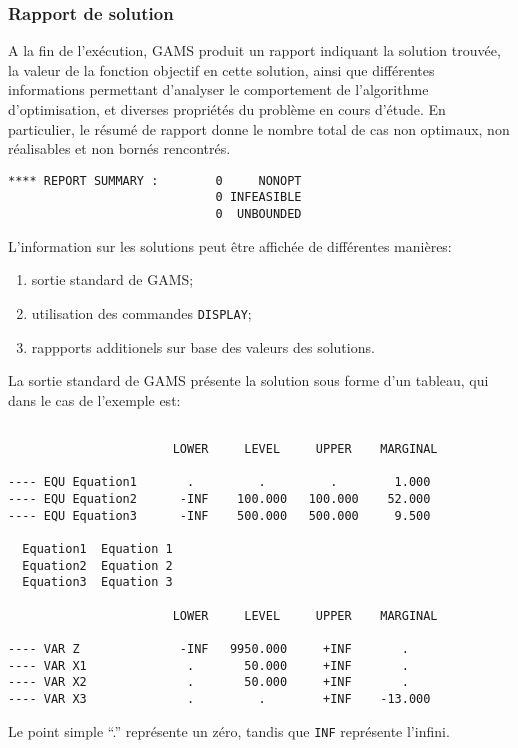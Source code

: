 \subsubsection{Rapport de solution}

A la fin de l'exécution, GAMS produit un rapport indiquant la solution trouvée, la valeur de la fonction objectif en cette solution, ainsi que différentes informations permettant d'analyser le comportement de l'algorithme d'optimisation, et diverses propriétés du problème en cours d'étude.
En particulier, le résumé de rapport donne le nombre total de cas non optimaux, non réalisables et non bornés rencontrés.
\begin{verbatim}
**** REPORT SUMMARY :        0     NONOPT
                             0 INFEASIBLE
                             0  UNBOUNDED
\end{verbatim}

L'information sur les solutions peut être affichée de différentes manières:
\begin{enumerate}
\item
sortie standard de GAMS;
\item
utilisation des commandes \verb|DISPLAY|;
\item
rappports additionels sur base des valeurs des solutions.
\end{enumerate}

La sortie standard de GAMS présente la solution sous forme d'un tableau, qui dans le cas de l'exemple est:
\begin{verbatim}

                       LOWER     LEVEL     UPPER    MARGINAL

---- EQU Equation1       .         .         .        1.000      
---- EQU Equation2      -INF    100.000   100.000    52.000      
---- EQU Equation3      -INF    500.000   500.000     9.500      

  Equation1  Equation 1
  Equation2  Equation 2
  Equation3  Equation 3

                       LOWER     LEVEL     UPPER    MARGINAL

---- VAR Z              -INF   9950.000     +INF       .         
---- VAR X1              .       50.000     +INF       .         
---- VAR X2              .       50.000     +INF       .         
---- VAR X3              .         .        +INF    -13.000      
\end{verbatim}

Le point simple ``.'' représente un zéro, tandis que \verb|INF| représente l'infini.

